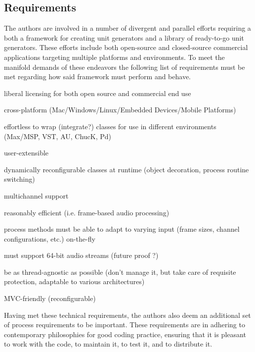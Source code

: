 \documentclass[twoside,10pt]{article}
\newenvironment{packed_item}{
\begin{itemize}
  \setlength{\itemsep}{1pt}
  \setlength{\parskip}{0pt}
  \setlength{\parsep}{0pt}
}{\end{itemize}}
\begin{document}
\subsection{Requirements}

The authors are involved in a number of divergent and parallel efforts requiring a both a framework for creating unit generators and a library of ready-to-go unit generators.  These efforts include both open-source and closed-source commercial applications targeting multiple platforms and environments.  To meet the manifold demands of these endeavors the following list of requirements must be met regarding how said framework must perform and behave.

\begin{packed_item}%
	\item liberal licensing for both open source and commercial end use
	\item cross-platform (Mac/Windows/Linux/Embedded Devices/Mobile Platforms)	
	\item effortless to wrap (integrate?) classes for use in different environments (Max/MSP, VST, AU, ChucK, Pd)
	\item user-extensible
	\item dynamically reconfigurable classes at runtime (object decoration, process routine switching)
	\item multichannel support
	\item reasonably efficient (i.e. frame-based audio processing)
	\item process methods must be able to adapt to varying input (frame sizes, channel configurations, etc.) on-the-fly
	\item must support 64-bit audio streams (future proof ?)
	\item be as thread-agnostic as possible (don't manage it, but take care of requisite protection, adaptable to various architectures)
	\item MVC-friendly (reconfigurable)
\end{packed_item}%

Having met these technical requirements, the authors also deem an additional set of process requirements to be important.  These requirements are in adhering to contemporary philosophies for good coding practice, ensuring that it is pleasant to work with the code, to maintain it, to test it, and to distribute it.
\end{document}

